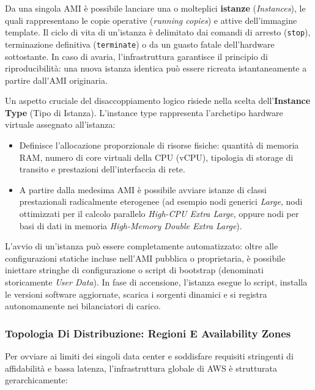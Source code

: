 \documentclass[11pt, a4paper]{article}
\begin{document}

Da una singola AMI è possibile lanciare una o molteplici \textbf{istanze} (\emph{Instances}), le quali rappresentano le copie operative (\emph{running copies}) e attive dell'immagine template. Il ciclo di vita di un'istanza è delimitato dai comandi di arresto (\texttt{stop}), terminazione definitiva (\texttt{terminate}) o da un guasto fatale dell'hardware sottostante. In caso di avaria, l'infrastruttura garantisce il principio di riproducibilità: una nuova istanza identica può essere ricreata istantaneamente a partire dall'AMI originaria.


Un aspetto cruciale del disaccoppiamento logico risiede nella scelta dell'\textbf{Instance Type} (Tipo di Istanza). L'instance type rappresenta l'archetipo hardware virtuale assegnato all'istanza:
\begin{itemize}
    \item Definisce l'allocazione proporzionale di risorse fisiche: quantità di memoria RAM, numero di core virtuali della CPU (vCPU), tipologia di storage di transito e prestazioni dell'interfaccia di rete.
    \item A partire dalla medesima AMI è possibile avviare istanze di classi prestazionali radicalmente eterogenee (ad esempio nodi generici \emph{Large}, nodi ottimizzati per il calcolo parallelo \emph{High-CPU Extra Large}, oppure nodi per basi di dati in memoria \emph{High-Memory Double Extra Large}).
\end{itemize}

L'avvio di un'istanza può essere completamente automatizzato: oltre alle configurazioni statiche incluse nell'AMI pubblica o proprietaria, è possibile iniettare stringhe di configurazione o script di bootstrap (denominati storicamente \emph{User Data}). In fase di accensione, l'istanza esegue lo script, installa le versioni software aggiornate, scarica i sorgenti dinamici e si registra autonomamente nei bilanciatori di carico.

\subsubsection{Topologia Di Distribuzione: Regioni E Availability Zones}
Per ovviare ai limiti dei singoli data center e soddisfare requisiti stringenti di affidabilità e bassa latenza, l'infrastruttura globale di AWS è strutturata gerarchicamente:
\end{document}
